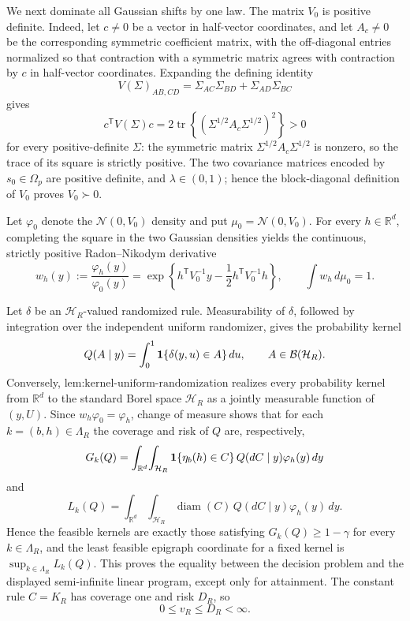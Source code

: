 We next dominate all Gaussian shifts by one law.  The matrix \(V_0\) is positive definite.  Indeed, let \(c\ne0\) be a vector in half-vector coordinates, and let \(A_c\ne0\) be the corresponding symmetric coefficient matrix, with the off-diagonal entries normalized so that contraction with a symmetric matrix agrees with contraction by \(c\) in half-vector coordinates.  Expanding the defining identity
\[
V(\Sigma)_{AB,CD}=\Sigma_{AC}\Sigma_{BD}+\Sigma_{AD}\Sigma_{BC}
\]
gives
\[
c^{\mathsf T}V(\Sigma)c
=2\operatorname{tr}\!\left\{(\Sigma^{1/2}A_c\Sigma^{1/2})^2\right\}>0
\]
for every positive-definite \(\Sigma\): the symmetric matrix \(\Sigma^{1/2}A_c\Sigma^{1/2}\) is nonzero, so the trace of its square is strictly positive.  The two covariance matrices encoded by \(s_0\in\Omega_p\) are positive definite, and \(\lambda\in(0,1)\); hence the block-diagonal definition of \(V_0\) proves \(V_0\succ0\).

Let \(\varphi_0\) denote the \(\mathcal N(0,V_0)\) density and put \(\mu_0=\mathcal N(0,V_0)\).  For every \(h\in\mathbb R^d\), completing the square in the two Gaussian densities yields the continuous, strictly positive Radon--Nikodym derivative
\[
w_h(y):=\frac{\varphi_h(y)}{\varphi_0(y)}
=\exp\!\left\{h^{\mathsf T}V_0^{-1}y
-\frac12 h^{\mathsf T}V_0^{-1}h\right\},
\qquad
\int w_h\,d\mu_0=1.
\]

Let \(\delta\) be an \(\mathcal H_R\)-valued randomized rule.  Measurability of \(\delta\), followed by integration over the independent uniform randomizer, gives the probability kernel
\[
Q(A\mid y)=\int_0^1 {\bf1}\{\delta(y,u)\in A\}\,du,
\qquad A\in\mathcal B(\mathcal H_R).
\]
Conversely, \(\text{lem:kernel-uniform-randomization}\) realizes every probability kernel from \(\mathbb R^d\) to the standard Borel space \(\mathcal H_R\) as a jointly measurable function of \((y,U)\).  Since \(w_h\varphi_0=\varphi_h\), change of measure shows that for each \(k=(b,h)\in\Lambda_R\) the coverage and risk of \(Q\) are, respectively,
\[
G_k(Q)=\int_{\mathbb R^d}\!\int_{\mathcal H_R}
 {\bf1}\{\eta_b(h)\in C\}\,Q(dC\mid y)\varphi_h(y)\,dy
\]
and
\[
L_k(Q)=\int_{\mathbb R^d}\!\int_{\mathcal H_R}
 \operatorname{diam}(C)\,Q(dC\mid y)\varphi_h(y)\,dy.
\]
Hence the feasible kernels are exactly those satisfying \(G_k(Q)\ge1-\gamma\) for every \(k\in\Lambda_R\), and the least feasible epigraph coordinate for a fixed kernel is \(\sup_{k\in\Lambda_R}L_k(Q)\).  This proves the equality between the decision problem and the displayed semi-infinite linear program, except only for attainment.  The constant rule \(C=K_R\) has coverage one and risk \(D_R\), so
\[
0\le v_R\le D_R<\infty.
\]

